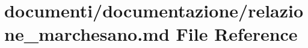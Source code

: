 \hypertarget{relazione__marchesano_8md}{}\section{documenti/documentazione/relazione\+\_\+marchesano.md File Reference}
\label{relazione__marchesano_8md}
